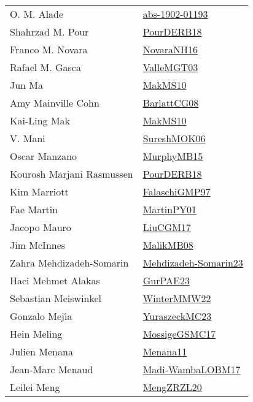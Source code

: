 {\begin{longtable}{p{4cm}p{20cm}}
O. M. Alade & \href{articles/abs-1902-01193.pdf}{abs-1902-01193}\cite{abs-1902-01193} \\
Shahrzad M. Pour & \href{articles/PourDERB18.pdf}{PourDERB18}\cite{PourDERB18} \\
Franco M. Novara & \href{articles/NovaraNH16.pdf}{NovaraNH16}\cite{NovaraNH16} \\
Rafael M. Gasca & \href{papers/ValleMGT03.pdf}{ValleMGT03}\cite{ValleMGT03} \\
Jun Ma & \href{papers/MakMS10.pdf}{MakMS10}\cite{MakMS10} \\
Amy Mainville Cohn & \href{papers/BarlattCG08.pdf}{BarlattCG08}\cite{BarlattCG08} \\
Kai{-}Ling Mak & \href{papers/MakMS10.pdf}{MakMS10}\cite{MakMS10} \\
V. Mani & \href{}{SureshMOK06}\cite{SureshMOK06} \\
Oscar Manzano & \href{papers/MurphyMB15.pdf}{MurphyMB15}\cite{MurphyMB15} \\
Kourosh Marjani Rasmussen & \href{articles/PourDERB18.pdf}{PourDERB18}\cite{PourDERB18} \\
Kim Marriott & \href{articles/FalaschiGMP97.pdf}{FalaschiGMP97}\cite{FalaschiGMP97} \\
Fae Martin & \href{articles/MartinPY01.pdf}{MartinPY01}\cite{MartinPY01} \\
Jacopo Mauro & \href{papers/LiuCGM17.pdf}{LiuCGM17}\cite{LiuCGM17} \\
Jim McInnes & \href{}{MalikMB08}\cite{MalikMB08} \\
Zahra Mehdizadeh{-}Somarin & \href{papers/Mehdizadeh-Somarin23.pdf}{Mehdizadeh-Somarin23}\cite{Mehdizadeh-Somarin23} \\
Haci Mehmet Alakas & \href{articles/GurPAE23.pdf}{GurPAE23}\cite{GurPAE23} \\
Sebastian Meiswinkel & \href{papers/WinterMMW22.pdf}{WinterMMW22}\cite{WinterMMW22} \\
Gonzalo Mej{\'{\i}}a & \href{papers/YuraszeckMC23.pdf}{YuraszeckMC23}\cite{YuraszeckMC23} \\
Hein Meling & \href{papers/MossigeGSMC17.pdf}{MossigeGSMC17}\cite{MossigeGSMC17} \\
Julien Menana & \href{}{Menana11}\cite{Menana11} \\
Jean{-}Marc Menaud & \href{papers/Madi-WambaLOBM17.pdf}{Madi-WambaLOBM17}\cite{Madi-WambaLOBM17} \\
Leilei Meng & \href{articles/MengZRZL20.pdf}{MengZRZL20}\cite{MengZRZL20} \\

\end{longtable}}
